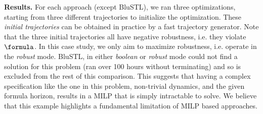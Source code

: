 
\textbf{Results.}
For each approach (except BluSTL), we ran three optimizations, starting from three different trajectories to initialize the optimization. These \textit{initial trajectories} can be obtained in practice by a fast trajectory generator. Note that the three initial trajectories all have negative robustness, i.e. they violate $\formula$.
In this case study, we only aim to maximize robustness, i.e. operate in the \textit{robust} mode. BluSTL, in either \textit{boolean} or \textit{robust} mode could not find a solution for this problem (ran over 100 hours without terminating) and so is excluded from the rest of this comparison. This suggests that having a complex specification like the one in this problem, non-trivial dynamics, and the given formula horizon, results in a MILP that is simply intractable to solve. We believe that this example highlights a fundamental limitation of MILP based approaches.




